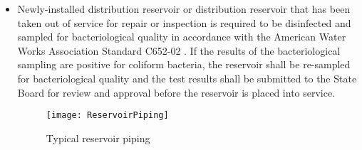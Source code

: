\begin{itemize}
\item Newly-installed distribution reservoir or distribution reservoir that has been taken out of service for repair or inspection is required to be disinfected and sampled for bacteriological quality in accordance with the American Water Works Association Standard C652-02 . If the results of the bacteriological sampling are positive for coliform bacteria, the reservoir shall be re-sampled for bacteriological quality and the test results shall be submitted to the State Board for review and approval before the reservoir is placed into service.
\begin{figure}[h]
\begin{center}
        \texttt{[image: ReservoirPiping]}
        \caption{Typical reservoir piping}
\end{center}
\end{figure}
\end{itemize}
   \vspace{-2em} 
